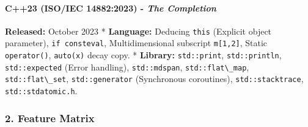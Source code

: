 \hypertarget{c23-isoiec-148822023---the-completion}{%
\paragraph{\texorpdfstring{\textbf{C++23 (ISO/IEC 14882:2023)} -
\emph{The
Completion}}{C++23 (ISO/IEC 14882:2023) - The Completion}}\label{c23-isoiec-148822023---the-completion}}

\textbf{Released:} October 2023 * \textbf{Language:} Deducing
\passthrough{\lstinline!this!} (Explicit object parameter),
\passthrough{\lstinline!if consteval!}, Multidimensional subscript
\passthrough{\lstinline!m[1,2]!}, Static
\passthrough{\lstinline!operator()!}, \passthrough{\lstinline!auto(x)!}
decay copy. * \textbf{Library:} \passthrough{\lstinline!std::print!},
\passthrough{\lstinline!std::println!},
\passthrough{\lstinline!std::expected!} (Error handling),
\passthrough{\lstinline!std::mdspan!},
\passthrough{\lstinline!std::flat\_map!},
\passthrough{\lstinline!std::flat\_set!},
\passthrough{\lstinline!std::generator!} (Synchronous coroutines),
\passthrough{\lstinline!std::stacktrace!},
\passthrough{\lstinline!std::stdatomic.h!}.

\hypertarget{feature-matrix}{%
\subsubsection{2. Feature Matrix}\label{feature-matrix}}

